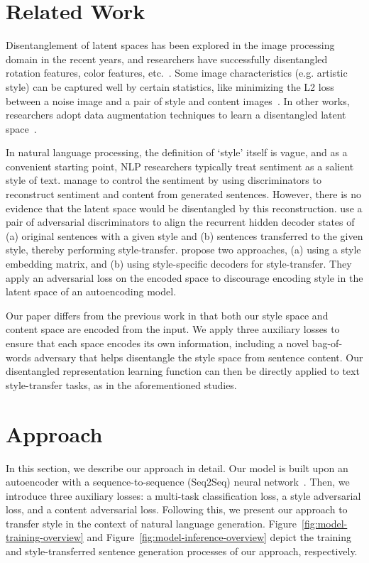 \documentclass[letterpaper]{article} %
\newcommand{\citeay}[1]{\citeauthor{#1} \shortcite{#1}}
\begin{document}
\section{Related Work}

Disentanglement of latent spaces has been explored in the image processing domain in the recent years, and researchers have successfully disentangled rotation features, color features, etc.~\cite{chen2016infogan,luan2017deep}. Some image characteristics (e.g. artistic style) can be captured well by certain statistics, like minimizing the L2 loss between a noise image and a pair of style and content images~\cite{gatys2016image}. In other works, researchers adopt data augmentation techniques to learn a disentangled latent space~\cite{kulkarni2015deep,champandard2016semantic}.

In natural language processing, the definition of `style' itself is vague, and as a convenient starting point, NLP researchers typically treat sentiment as a salient style of text. \citeay{hu2017toward} manage to control the sentiment by using discriminators to reconstruct sentiment and content from generated sentences. However, there is no evidence that the latent space would be disentangled by this reconstruction. \citeay{shen2017style} use a pair of adversarial discriminators to align the recurrent hidden decoder states of (a) original sentences with a given style and (b) sentences transferred to the given style, thereby performing style-transfer. \citeay{fu2017style} propose two approaches, (a) using a style embedding matrix, and (b) using style-specific decoders for style-transfer. They apply an adversarial loss on the encoded space to discourage encoding style in the latent space of an autoencoding model.

Our paper differs from the previous work in that both our style space and content space are encoded from the input. We apply three auxiliary losses to ensure that each space encodes its own information, including a novel bag-of-words adversary that helps disentangle the style space from sentence content. Our disentangled representation learning function can then be directly applied to text style-transfer tasks, as in the aforementioned studies.


\section{Approach}

In this section, we describe our approach in detail. Our model is built upon an autoencoder with a sequence-to-sequence (Seq2Seq) neural network~\cite{sutskever2014sequence}. Then, we introduce three auxiliary losses: a multi-task classification loss, a style adversarial loss, and a content adversarial loss. Following this, we present our approach to transfer style in the context of natural language generation. Figure~\ref{fig:model-training-overview} and Figure~\ref{fig:model-inference-overview} depict the training and style-transferred sentence generation processes of our approach, respectively.
\end{document}
